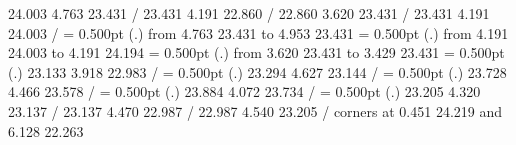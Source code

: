 {{\color[rgb]{0,0,0} 24.003  4.763 23.431 /
 23.431  4.191 22.860 /
 22.860  3.620 23.431 /
 23.431  4.191 24.003 /
}%
%
%
\linethickness= 0.500pt
\setplotsymbol ({\thinlinefont .})
{\color[rgb]{0,0,0}\putrule from  4.763 23.431 to  4.953 23.431
}%
%
%
\linethickness= 0.500pt
\setplotsymbol ({\thinlinefont .})
{\color[rgb]{0,0,0}\putrule from  4.191 24.003 to  4.191 24.194
}%
%
%
\linethickness= 0.500pt
\setplotsymbol ({\thinlinefont .})
{\color[rgb]{0,0,0}\putrule from  3.620 23.431 to  3.429 23.431
}%
%
%
\linethickness= 0.500pt
\setplotsymbol ({\thinlinefont .})
{\color[rgb]{0,0,0} 23.133  3.918 22.983 /
}%
%
%
\linethickness= 0.500pt
\setplotsymbol ({\thinlinefont .})
{\color[rgb]{0,0,0} 23.294  4.627 23.144 /
}%
%
%
\linethickness= 0.500pt
\setplotsymbol ({\thinlinefont .})
{\color[rgb]{0,0,0} 23.728  4.466 23.578 /
}%
%
%
\linethickness= 0.500pt
\setplotsymbol ({\thinlinefont .})
{\color[rgb]{0,0,0} 23.884  4.072 23.734 /
}%
%
%
\linethickness= 0.500pt
\setplotsymbol ({\thinlinefont .})
{\color[rgb]{0,0,0} 23.205  4.320 23.137 /
 23.137  4.470 22.987 /
 22.987  4.540 23.205 /
}%
\linethickness=0pt
\putrectangle corners at  0.451 24.219 and  6.128 22.263
\endpicture}
